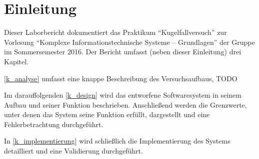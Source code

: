 \chapter{Einleitung}
Dieser Laborbericht dokumentiert das Praktikum \enquote{Kugelfallversuch} zur Vorlesung \enquote{Komplexe Informationstechnische Systeme -- Grundlagen} der Gruppe im Sommersemester 2016.
Der Bericht umfasst (neben dieser Einleitung) drei Kapitel.

\cref{k_analyse} umfasst eine knappe Beschreibung des Versuchsaufbaus, TODO

Im darauffolgenden \cref{k_design} wird das entworfene Softwaresystem in seinem Aufbau und seiner Funktion beschrieben.
Anschließend werden die Grenzwerte, unter denen das System seine Funktion erfüllt, dargestellt und eine Fehlerbetrachtung durchgeführt.

In \cref{k_implementierung} wird schließlich die Implementierung des Systems detailliert und eine Validierung durchgeführt.
